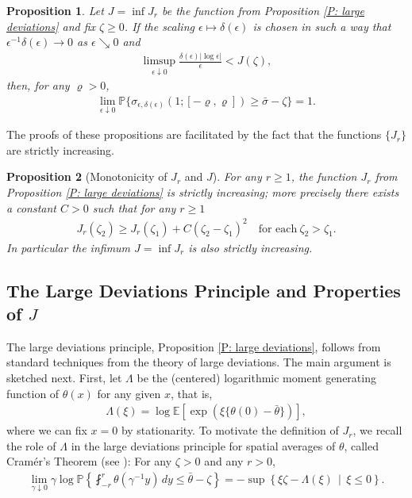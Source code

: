 \documentclass[12pt]{amsart}
\newtheorem{prop}{Proposition}
\begin{document}
	\begin{prop} \label{P: upper deviations} Let $J = \inf J_{r}$ be the function from Proposition \ref{P: large deviations} and fix $\zeta \geq 0$.  If the scaling $\epsilon \mapsto \delta(\epsilon)$ is chosen in such a way that $\epsilon^{-1} \delta(\epsilon) \to 0$ as $\epsilon \searrow 0$ and
		\begin{align}\label{eqn:lb-helper-minus-two}
			\limsup_{ \epsilon \downarrow 0 } \frac{ \delta(\epsilon) | \log \epsilon | }{ \epsilon }  < J( \zeta ),
		\end{align}
	then, for any $\varrho > 0$,
		\begin{align*}
			\lim_{ \epsilon \downarrow 0 } \mathbb{P} \{ \sigma_{\epsilon,\delta(\epsilon)}(1; [ - \varrho , \varrho ] ) \geq \bar{\sigma} - \zeta \} = 1.
		\end{align*}
	\end{prop}

	The proofs of these propositions are facilitated by the fact that the functions $\{J_{r}\}$ are strictly increasing.

	\begin{prop}[Monotonicity of $ J_{ r } $ and $ J $] \label{cor:monotonicity-jr}
	For any $r \geq 1$, the function $ J_{ r } $ from Proposition \ref{P: large deviations} is strictly increasing; more precisely there exists a constant $ C > 0 $ such that for any $ r \geq 1 $
		\begin{align*}
			J_{ r } ( \zeta_{2} ) \geq J_{ r } ( \zeta_{1} ) + C ( \zeta_{2} - \zeta_{1} )^{2} \quad \text{for each} ~ \zeta_{2} > \zeta_{1} .
		\end{align*}
	In particular the infimum $ J = \inf J_{r} $ is also strictly increasing.
\end{prop}

\subsection{The Large Deviations Principle and Properties of $J$} \label{S: large deviations explained} The large deviations principle, Proposition \ref{P: large deviations}, follows from standard techniques from the theory of large deviations.  The main argument is sketched next.  First, let $\Lambda$ be the (centered) logarithmic moment generating function of $\theta(x)$ for any given $x$, that is,
	\begin{align} \label{E: moment generating function}
		\Lambda(\xi) = \log \mathbb{E} [ \exp ( \xi \{ \theta(0) - \bar{\theta} \} ) ],
	\end{align}
where we can fix $x = 0$ by stationarity. To motivate the definition of $J_{r}$, we recall the role of $\Lambda$ in the large deviations principle for spatial averages of $\theta$, called Cram\'{e}r's Theorem (see \cite{dembo_zeitouni,Rassoul-Agha,varadhan}): For any $\zeta > 0$ and any $r > 0$,
	\begin{align*}
		\lim_{ \gamma \downarrow 0 } \gamma \log \mathbb{P} \left\{ \fint_{-r}^{r} \theta( \gamma^{-1} y) \, dy \leq \bar{\theta} - \zeta \right\} = -\sup \left\{ \xi \zeta - \Lambda(\xi) \, \mid \, \xi \leq 0 \right\}.
	\end{align*}
\end{document}

